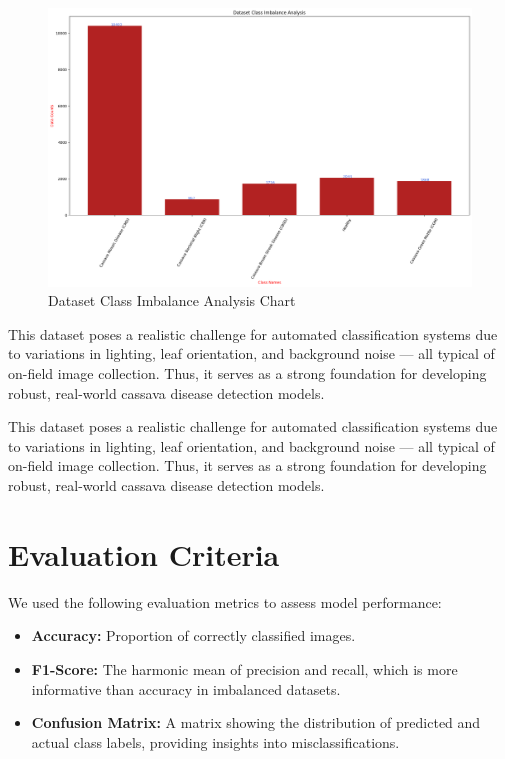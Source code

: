 \begin{figure}[H]
  \centering
  \includegraphics[width=1.0\linewidth]{figures/data_chart.png}
  \caption{Dataset Class Imbalance Analysis Chart}
  \label{fig:cmd}
\end{figure}


This dataset poses a realistic challenge for automated classification systems due to variations in lighting, leaf orientation, and background noise — all typical of on-field image collection. Thus, it serves as a strong foundation for developing robust, real-world cassava disease detection models.



This dataset poses a realistic challenge for automated classification systems due to variations in lighting, leaf orientation, and background noise — all typical of on-field image collection. Thus, it serves as a strong foundation for developing robust, real-world cassava disease detection models.

\section{Evaluation Criteria}
We used the following evaluation metrics to assess model performance:
\begin{itemize}
  \item \textbf{Accuracy:} Proportion of correctly classified images.
  \item \textbf{F1-Score:} The harmonic mean of precision and recall, which is more informative than accuracy in imbalanced datasets.
  \item \textbf{Confusion Matrix:} A matrix showing the distribution of predicted and actual class labels, providing insights into misclassifications.
\end{itemize}

